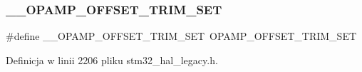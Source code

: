 \subsubsection{\texorpdfstring{\+\_\+\+\_\+\+O\+P\+A\+M\+P\+\_\+\+O\+F\+F\+S\+E\+T\+\_\+\+T\+R\+I\+M\+\_\+\+S\+ET}{\_\_OPAMP\_OFFSET\_TRIM\_SET}}
{\footnotesize\ttfamily \#define \+\_\+\+\_\+\+O\+P\+A\+M\+P\+\_\+\+O\+F\+F\+S\+E\+T\+\_\+\+T\+R\+I\+M\+\_\+\+S\+ET~O\+P\+A\+M\+P\+\_\+\+O\+F\+F\+S\+E\+T\+\_\+\+T\+R\+I\+M\+\_\+\+S\+ET}



Definicja w linii 2206 pliku stm32\+\_\+hal\+\_\+legacy.\+h.

